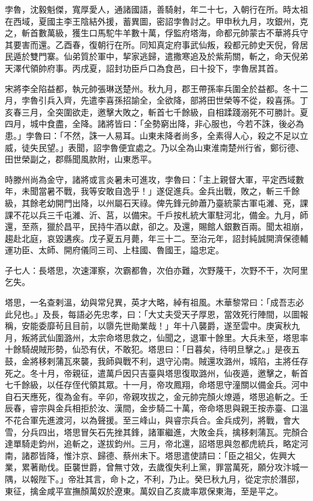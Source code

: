 \begin{pinyinscope}
 孛魯，沈毅魁傑，寬厚愛人，通諸國語，善騎射，年二十七，入朝行在所。時太祖在西域，夏國主李王陰結外援，蓄異圖，密詔孛魯討之。甲申秋九月，攻銀州，克之，斬首數萬級，獲生口馬駝牛羊數十萬，俘監府塔海，命都元帥蒙古不華將兵守其要害而還。乙酉春，復朝行在所。同知真定府事武仙叛，殺都元帥史天倪，脅居民遁於雙門寨。仙弟質於軍中，挈家逃歸，遣撒寒追及於紫荊關，斬之，命天倪弟天澤代領帥府事。丙戌夏，詔封功臣戶口為食邑，曰十投下，孛魯居其首。



 宋將李全陷益都，執元帥張琳送楚州。秋九月，郡王帶孫率兵圍全於益都。冬十二月，孛魯引兵入齊，先遣李喜孫招諭全，全欲降，部將田世榮等不從，殺喜孫。丁亥春三月，全突圍欲走，邀擊大敗之，斬首七千餘級，自相蹂踐溺死不可勝計。夏四月，城中食盡，全降。諸將皆曰：「全勢窮出降，非心服也，今若不誅，後必為患。」孛魯曰：「不然，誅一人易耳。山東未降者尚多，全素得人心，殺之不足以立威，徒失民望。」表聞，詔孛魯便宜處之。乃以全為山東淮南楚州行省，鄭衍德、田世榮副之，郡縣聞風款附，山東悉平。



 時滕州尚為金守，諸將或言炎暑未可進攻，孛魯曰：「主上親督大軍，平定西域數年，未聞當暑不戰，我等安敢自逸乎！」遂促進兵。金兵出戰，敗之，斬三千餘級，其餘老幼開門出降，以州屬石天祿。俾先鋒元帥蕭乃臺統蒙古軍屯濰、兗，課課不花以兵三千屯濰、沂、莒，以備宋。千戶按札統大軍駐河北，備金。九月，師還，至燕，獵於昌平，民持牛酒以獻，卻之。及還，賜館人銀數百兩。聞太祖崩，趨赴北庭，哀毀遘疾。戊子夏五月薨，年三十二。至治元年，詔封純誠開濟保德輔運功臣、太師、開府儀同三司、上柱國、魯國王，謚忠定。



 子七人：長塔思，次速渾察，次霸都魯，次伯亦難，次野蔑干，次野不干，次阿里乞失。



 塔思，一名查剌溫，幼與常兒異，英才大略，綽有祖風。木華黎常曰：「成吾志必此兒也。」及長，每語必先忠孝，曰：「大丈夫受天子厚恩，當效死行陣間，以圖報稱，安能委靡茍且目前，以隳先世勛業哉！」年十八襲爵，遂至雲中。庚寅秋九月，叛將武仙圍潞州，太宗命塔思救之，仙聞之，退軍十餘里。大兵未至，塔思率十餘騎覘賊形勢，仙恐有伏，不敢犯。塔思曰：「日暮矣，待明旦擊之。」是夜五鼓，金將移剌蒲瓦來襲，我師與戰不利，退守沁南。賊還攻潞州，城陷，主將任存死之。冬十月，帝親征，遣萬戶因只吉臺與塔思復取潞州，仙夜遁，邀擊之，斬首七千餘級，以任存侄代領其眾。十一月，帝攻鳳翔，命塔思守潼關以備金兵。河中自石天應死，復為金有。辛卯，帝親攻拔之，金元帥完顏火燎遁，塔思追斬之。壬辰春，睿宗與金兵相拒於汝、漢間，金步騎二十萬，帝命塔思與親王按赤臺、口溫不花合軍先進渡河，以為聲援。至三峰山，與睿宗兵合。金兵成列，將戰，會大雪，分兵四出，塔思冒矢石先挫其鋒，諸軍繼進，大敗金兵，擒移剌蒲瓦。完顏合達單騎走鈞州，追斬之，遂拔鈞州。三月，帝北還，詔塔思與忽都虎統兵，略定河南，諸郡皆降，惟汴京、歸德、蔡州未下。塔思遣使請曰：「臣之祖父，佐興大業，累著勛伐。臣襲世爵，曾無寸效，去歲復失利上黨，罪當萬死，願分攻汴城一隅，以報陛下。」帝壯其言，命卜之，不利，乃止。癸巳秋九月，從定宗於潛邸，東征，擒金咸平宣撫顏萬奴於遼東。萬奴自乙亥歲率眾保東海，至是平之。




\end{pinyinscope}
